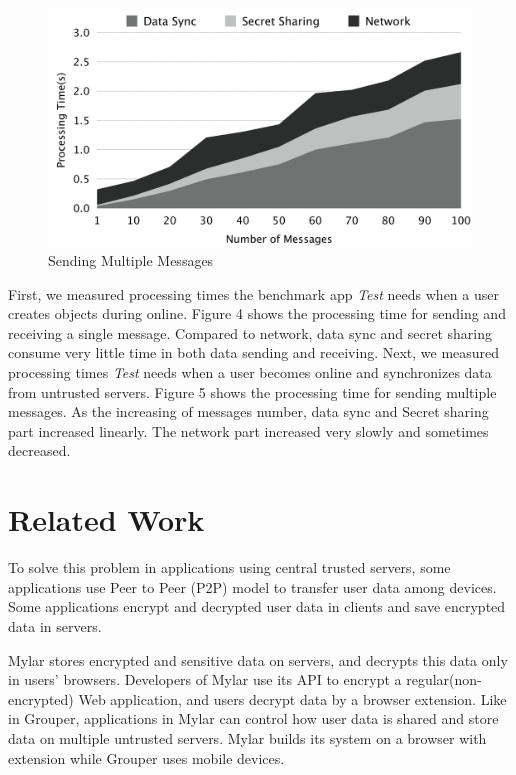 \documentclass[twocolumn,10pt]{article}
\begin{document}
\begin{figure}[t]
	\centering
	\includegraphics[scale=0.12]{processing2}
	\caption{Sending Multiple Messages}
\end{figure}

First, we measured processing times the benchmark app \emph{Test} needs when a user creates objects during online. Figure 4 shows the processing time for sending and receiving a single message. Compared to network, data sync and secret sharing consume very little time in both data sending and receiving. Next, we measured processing times \emph{Test} needs when a user becomes online and synchronizes data from untrusted servers. Figure 5 shows the processing time for sending multiple messages. As the increasing of messages number, data sync and Secret sharing part increased linearly. The network part increased very slowly and sometimes decreased.

\section{Related Work}

To solve this problem in applications using central trusted servers, some applications use Peer to Peer (P2P) model to transfer user data among devices. Some applications encrypt and decrypted user data in clients and save encrypted data in servers. 

Mylar\cite{popa2014building} stores encrypted and sensitive data on servers, and decrypts this data only in users’ browsers. Developers of Mylar use its API to encrypt a regular(non-encrypted) Web application, and users decrypt data by a browser extension. Like in Grouper, applications in Mylar can control how user data is shared and store data on multiple untrusted servers. Mylar builds its system on a browser with extension while Grouper uses mobile devices.
\end{document}

